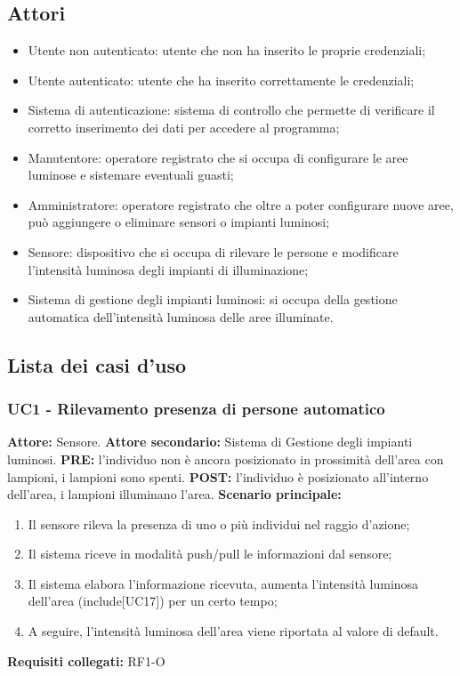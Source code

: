 \documentclass[a4paper, 12pt]{article}
\begin{document}
\subsection{Attori}
\begin{itemize}
    \item Utente non autenticato: utente che non ha inserito le proprie credenziali;
    \item Utente autenticato: utente che ha inserito correttamente le credenziali;
    \item Sistema di autenticazione: sistema di controllo che permette di verificare il corretto inserimento dei dati per accedere al programma;
    \item Manutentore: operatore registrato che si occupa di configurare le aree luminose e sistemare eventuali guasti;
    \item Amministratore: operatore registrato che oltre a poter configurare nuove aree, può aggiungere o eliminare sensori o impianti luminosi;
    \item Sensore: dispositivo che si occupa di rilevare le persone e modificare l'intensità luminosa degli impianti di illuminazione;
    \item Sistema di gestione degli impianti luminosi: si occupa della gestione automatica dell'intensità luminosa delle aree illuminate.
\end{itemize}

\subsection{Lista dei casi d'uso}

\subsubsection{UC1 - Rilevamento presenza di persone automatico}
\textbf{Attore:} Sensore.\newline
\textbf{Attore secondario:} Sistema di Gestione degli impianti luminosi.\newline
\textbf{PRE:} l'individuo non è ancora posizionato in prossimità dell'area con lampioni, i lampioni sono spenti.\newline
\textbf{POST:} l'individuo è posizionato all'interno dell'area, i lampioni illuminano l'area.\newline
\textbf{Scenario principale:}
\begin{enumerate}
    \item Il sensore rileva la presenza di uno o più individui nel raggio d'azione;
    \item Il sistema riceve in modalità push/pull le informazioni dal sensore;
    \item Il sistema elabora l'informazione ricevuta, aumenta l'intensità luminosa dell'area (include[UC17]) per un certo tempo;
    \item A seguire, l'intensità luminosa dell'area viene riportata al valore di default.
\end{enumerate}
\textbf{Requisiti collegati:} RF1-O\newline 
\end{document}
